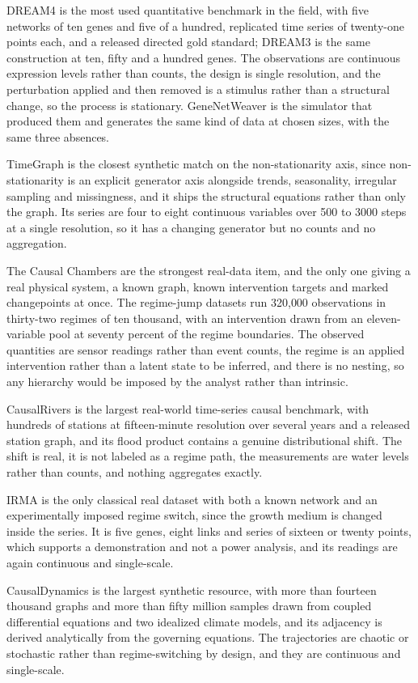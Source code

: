 DREAM4 is the most used quantitative benchmark in the field, with five networks
of ten genes and five of a hundred, replicated time series of twenty-one points
each, and a released directed gold standard; DREAM3 is the same construction at
ten, fifty and a hundred genes. The observations are continuous expression levels
rather than counts, the design is single resolution, and the perturbation applied
and then removed is a stimulus rather than a structural change, so the process is
stationary. GeneNetWeaver is the simulator that produced them and generates the
same kind of data at chosen sizes, with the same three absences.

TimeGraph is the closest synthetic match on the non-stationarity axis, since
non-stationarity is an explicit generator axis alongside trends, seasonality,
irregular sampling and missingness, and it ships the structural equations rather
than only the graph. Its series are four to eight continuous variables over 500
to 3000 steps at a single resolution, so it has a changing generator but no
counts and no aggregation.

The Causal Chambers are the strongest real-data item, and the only one giving a
real physical system, a known graph, known intervention targets and marked
changepoints at once. The regime-jump datasets run 320{,}000 observations in
thirty-two regimes of ten thousand, with an intervention drawn from an
eleven-variable pool at seventy percent of the regime boundaries. The observed
quantities are sensor readings rather than event counts, the regime is an applied
intervention rather than a latent state to be inferred, and there is no nesting,
so any hierarchy would be imposed by the analyst rather than intrinsic.

CausalRivers is the largest real-world time-series causal benchmark, with
hundreds of stations at fifteen-minute resolution over several years and a
released station graph, and its flood product contains a genuine distributional
shift. The shift is real, it is not labeled as a regime path, the measurements
are water levels rather than counts, and nothing aggregates exactly.

IRMA is the only classical real dataset with both a known network and an
experimentally imposed regime switch, since the growth medium is changed inside
the series. It is five genes, eight links and series of sixteen or twenty points,
which supports a demonstration and not a power analysis, and its readings are
again continuous and single-scale.

CausalDynamics is the largest synthetic resource, with more than fourteen
thousand graphs and more than fifty million samples drawn from coupled
differential equations and two idealized climate models, and its adjacency is
derived analytically from the governing equations. The trajectories are chaotic
or stochastic rather than regime-switching by design, and they are continuous and
single-scale.

